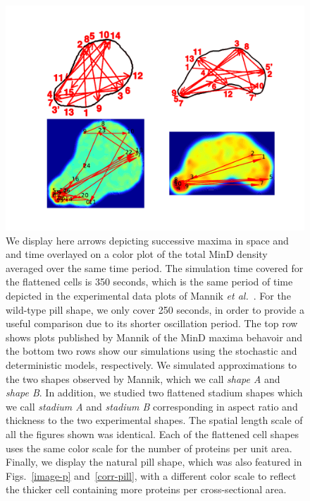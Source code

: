 \documentclass{pnastwo}
\begin{document}
\begin{article}
\begin{figure}
  \centering
  \includegraphics[width=16cm]{../paper/plot-ave}
  \caption{We display here arrows depicting successive maxima in space
    and and time overlayed on a color plot of the total MinD density
    averaged over the same time period.  The simulation time covered
    for the flattened cells is 350 seconds, which is the same
    period of time depicted in the experimental data plots of Mannik
    \emph{et al.}~\cite{mannik2012robustness}.  For the wild-type pill
    shape, we only cover 250 seconds, in order to provide a
    useful comparison due to its shorter oscillation period.  The top
    row shows plots published by Mannik of the MinD maxima behavoir
    and the bottom two rows show our simulations using the stochastic
    and deterministic models, respectively.  We simulated
    approximations to the two shapes observed by Mannik, which we call
    \emph{shape A} and \emph{shape B}.  In addition, we studied two
    flattened stadium shapes which we call \emph{stadium A} and
    \emph{stadium B} corresponding in aspect ratio and thickness to
    the two experimental shapes.  The spatial length scale of all the
    figures shown was identical. Each of the flattened cell shapes
    uses the same color scale for the number of proteins per unit
    area.  Finally, we display the natural pill shape, which was also
    featured in Figs.~\ref{image-p} and~\ref{corr-pill}, with a
    different color scale to reflect the thicker cell containing more
    proteins per cross-sectional area.  }
  \label{randst-plot-ave}
\end{figure}


\end{article}
\end{document}
